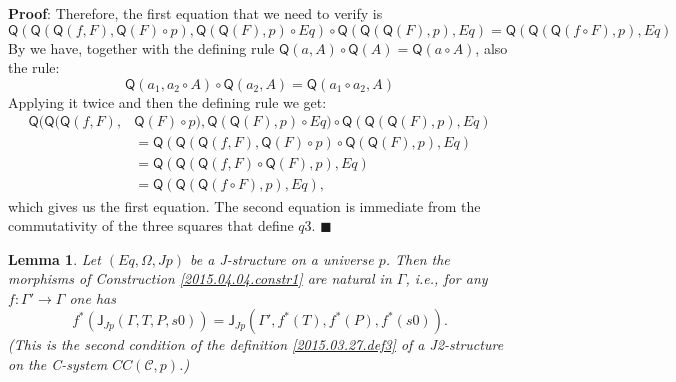 \documentclass[12pt]{article}
\numberwithin{equation}{section}
\newenvironment{eq}{\begin{equation}}{\end{equation}}
\newenvironment{myproof}{{\bf Proof}:}{$\blacksquare$ \vskip 5mm }
\newtheorem{lemma}[proposition]{Lemma}
\newcommand{\sr}{\rightarrow}
\newcommand{\toCC}{CC} %
\newcommand{\C}{{\mathcal C}}  %
\newcommand{\J}{\mathsf{J}}
\newcommand{\Q}{\mathsf{Q}}
\begin{document}
\begin{myproof}
%
Therefore, the first equation that we need to verify is
%
$$\Q(\Q(\Q(f,F),\Q(F)\circ p),\Q(\Q(F),p)\circ Eq)\circ \Q(\Q(\Q(F),p),Eq)=\Q(\Q(\Q(f\circ
F),p),Eq)$$
%
By \cite[Lemma 3.2]{fromunivwithPi} we have, together with the defining rule
$\Q(a,A)\circ \Q(A)=\Q(a\circ A)$, also the rule:
%
$$\Q(a_1,a_2\circ A)\circ \Q(a_2,A)=\Q(a_1\circ a_2, A)$$
%
Applying it twice and then the defining rule we get:
%
\begin{align*}
  \Q(\Q(\Q(f,F),&\Q(F)\circ p),\Q(\Q(F),p)\circ Eq)\circ \Q(\Q(\Q(F),p),Eq) \\
    & = \Q(\Q(\Q(f,F),\Q(F)\circ p)\circ \Q(\Q(F),p), Eq) \\
    & = \Q(\Q(\Q(f,F)\circ \Q(F),p),Eq) \\
    & = \Q(\Q(\Q(f\circ F),p),Eq),
\end{align*}
%
which gives us the first equation. The second equation is immediate from the
commutativity of the three squares that define $q3$.
\end{myproof}
%
\begin{lemma}
\label{2015.04.04.l1} Let $(Eq,\Omega,Jp)$ be a J-structure on a universe
$p$. Then the morphisms of Construction \ref{2015.04.04.constr1} are natural in
$\Gamma$, i.e., for any $f:\Gamma'\sr \Gamma$ one has
%
\begin{eq}\label{2015.04.04.eq3}
f^*(\J_{Jp}(\Gamma,T,P,s0))=\J_{Jp}(\Gamma',f^*(T),f^*(P),f^*(s0)).
\end{eq}%
(This is the second condition of the definition \ref{2015.03.27.def3} of a J2-structure on the C-system $\toCC({\C},p)$.)
\end{lemma}
%
\end{document}
